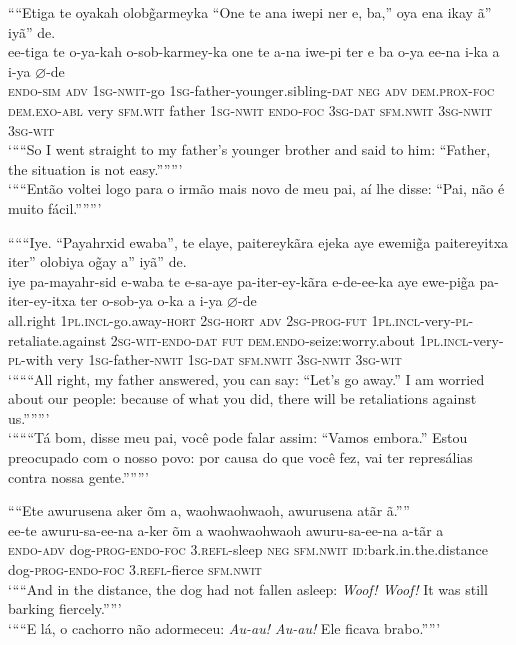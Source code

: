 \documentclass[output=paper,
modfonts,nonflat
]{langsci/langscibook}
\begin{document}
\ea ““Etiga te oyakah olob\~{g}armeyka “One te ana iwepi ner e, ba,” oya ena ikay ã” iyã” de.\\[.3em]
\gll ee-tiga te o-ya-kah o-sob-karmey-ka one te a-na iwe-pi{\footnotemark} ter e ba o-ya ee-na i-ka a i-ya \(\varnothing\)-de\\
\textsc{endo-sim} \textsc{adv} \textsc{1sg-nwit}-go \textsc{1sg}-father-younger.sibling-\textsc{dat} \textsc{neg} \textsc{adv} \textsc{dem.prox-foc} \textsc{dem.exo-abl} very \textsc{sfm.wit} father{\footnotemark} \textsc{1sg-nwit} \textsc{endo-foc} \textsc{3sg-dat} \textsc{sfm.nwit} \textsc{3sg-nwit} \textsc{3sg-wit}\\
\fnminus
{}
\fnplus
{}
\newpage 
\glt ‘““So I went straight to my father's younger brother and said to him: “Father, the situation is not easy.”””’\\
\glt ‘““Então voltei logo para o irmão mais novo de meu pai, aí lhe disse: “Pai, não é muito fácil.”””’\\
\z

\ea “““Iye. “Payahrxid ewaba”, te elaye, paitereykãra ejeka aye ewemi\~{g}a paitereyitxa iter” olobiya o\~{g}ay a” iyã” de.\\[.3em]
\gll iye pa-mayahr-sid e-waba te e-sa-aye pa-iter-ey-kãra e-de-ee-ka aye ewe-pi\~{g}a pa-iter-ey-itxa ter o-sob-ya o-ka a i-ya \(\varnothing\)-de\\
all.right \textsc{1pl.incl}-go.away-\textsc{hort} \textsc{2sg-hort} \textsc{adv} \textsc{2sg-prog-fut} \textsc{1pl.incl}-very-\textsc{pl}-retaliate.against \textsc{2sg-wit-endo-dat} \textsc{fut} \textsc{dem.endo}-seize:worry.about \textsc{1pl.incl}-very-\textsc{pl}-with very \textsc{1sg}-father-\textsc{nwit} \textsc{1sg-dat} \textsc{sfm.nwit} \textsc{3sg-nwit} \textsc{3sg-wit}\\
\glt ‘“““All right, my father answered, you can say: “Let's go away.” I am worried about our people: because of what you did, there will be retaliations against us.”””’\\
\glt ‘“““Tá bom, disse meu pai, você pode falar assim: “Vamos embora.” Estou preocupado com o nosso povo: por causa do que você fez, vai ter represálias contra nossa gente.”””’\\
\z

\ea ““Ete awurusena aker õm a, waohwaohwaoh, awurusena atãr ã.””\\[.3em]
\gll ee-te awuru-sa-ee-na a-ker õm a waohwaohwaoh awuru-sa-ee-na a-tãr a\\
\textsc{endo-adv} dog-\textsc{prog-endo-foc} \textsc{3.refl}-sleep \textsc{neg} \textsc{sfm.nwit} \textsc{id}:bark.in.the.distance dog-\textsc{prog-endo-foc} \textsc{3.refl}-fierce \textsc{sfm.nwit}\\
\glt ‘““And in the distance, the dog had not fallen asleep: \textit{Woof! Woof!} It was still barking fiercely.””’\\
\glt ‘““E lá, o cachorro não adormeceu: \textit{Au-au! Au-au!} Ele ficava brabo.””’\\
\z
\end{document}
